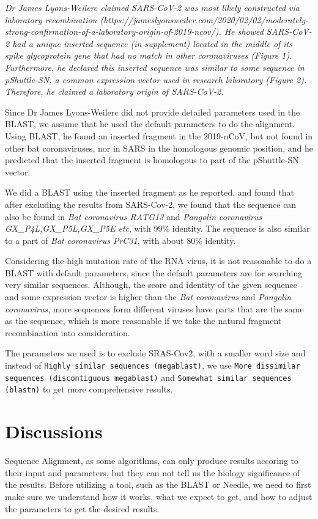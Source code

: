 \documentclass[en,black,10pt,normal]{elegantnote}
\begin{document}
\textit{Dr James Lyons-Weilerc claimed SARS-CoV-2 was most likely constructed via laboratory recombination 
(https://jameslyonsweiler.com/2020/02/02/moderately-strong-confirmation-of-a-laboratory-origin-of-2019-ncov/). 
He showed SARS-CoV-2 had a unique inserted sequence (in supplement) located in the middle of its spike glycoprotein gene that had no match in other coronaviruses (Figure 1). 
Furthermore, he declared this inserted sequence was similar to some sequence in pShuttle-SN, a common expression vector used in research laboratory (Figure 2). 
Therefore, he claimed a laboratory origin of SARS-CoV-2.}

Since Dr James Lyons-Weilerc did not provide detailed parameters used in the BLAST,
we assume that he used the default parameters to do the alignment. 
Using BLAST, he found an inserted fragment in the 2019-nCoV, but not found in other bat coronaviruses, nor in SARS in the homologous genomic position, and he predicted that the inserted fragment is homologous to part of the pShuttle-SN vector.

We did a BLAST using the inserted fragment as he reported, 
and found that after excluding the results from SARS-Cov-2,
we found that the sequence can also be found in \textit{Bat coronavirus RATG13} and 
\textit{Pangolin coronavirus GX\_P4L,GX\_P5L,GX\_P5E etc}, with 99\% identity.
The sequence is also similar to a part of \textit{Bat coronavirus PrC31}, with about 80\% identity.

Considering the high mutation rate of the RNA virus, it is not reasonable to do a BLAST with default parameters,
since the default parameters are for searching very similar sequences. Although, 
the score and identity of the given sequence and some expression vector is higher than the \textit{Bat coronavirus} and \textit{Pangolin coronavirus}, more sequences form different viruses have parts that are the same as the sequence, 
which is more reasonable if we take the natural fragment recombination into consideration.

The parameters we used is to exclude SRAS-Cov2, with a smaller word size and instead of \texttt{Highly similar sequences (megablast)}, we use \texttt{More dissimilar sequences (discontiguous megablast)} and \texttt{Somewhat similar sequences (blastn)} to get more comprehensive results.

\section{Discussions}
Sequence Alignment, as some algorithms, can only produce results accoring to their input and parameters,
but they can not tell us the biology significance of the results. Before utilizing a tool, such as the BLAST or Needle,
we need to first make sure we understand how it works, what we expect to get, and how to adjust the parameters to get
the desired results.
\end{document}
